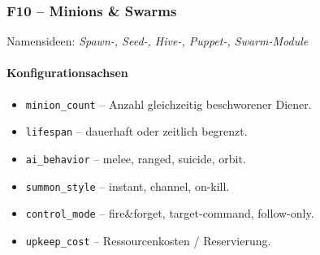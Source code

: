 \subsubsection{F10 – Minions \& Swarms}
Namensideen: \emph{Spawn-, Seed-, Hive-, Puppet-, Swarm-Module}

\paragraph{Konfigurationsachsen}{}

\begin{itemize}
	\item \texttt{minion\_count} – Anzahl gleichzeitig beschworener Diener.
	\item \texttt{lifespan} – dauerhaft oder zeitlich begrenzt.
	\item \texttt{ai\_behavior} – melee, ranged, suicide, orbit.
	\item \texttt{summon\_style} – instant, channel, on-kill.
	\item \texttt{control\_mode} – fire\&forget, target-command, follow-only.
	\item \texttt{upkeep\_cost} – Ressourcenkosten / Reservierung.
\end{itemize}


